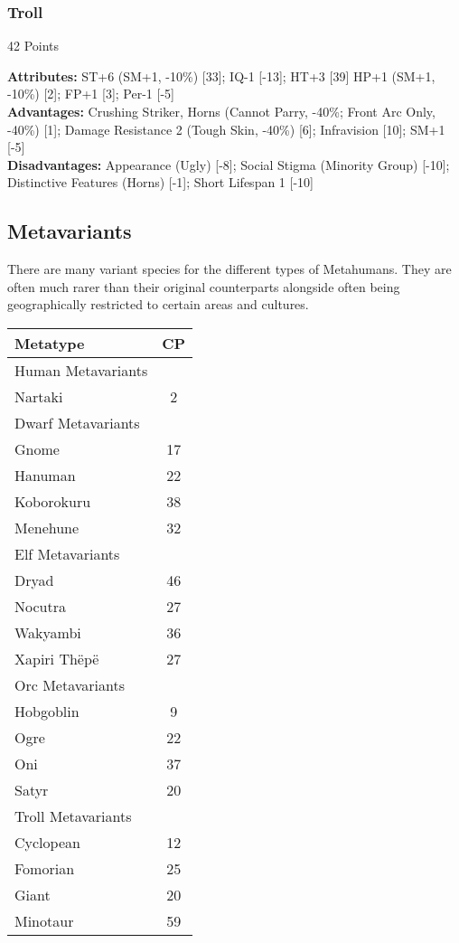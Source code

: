 \begin{multicols*}{3}
	\subsubsection*{Troll}
	\begin{flushright}
		42 Points
	\end{flushright}
	\textbf{Attributes:}
	ST+6 (SM+1, -10\%) [33]; IQ-1 [-13]; HT+3 [39] HP+1 (SM+1, -10\%) [2]; FP+1 [3]; Per-1 [-5]
	\\\textbf{Advantages:} 
	Crushing Striker, Horns (Cannot Parry, -40\%; Front Arc Only, -40\%) [1]; Damage Resistance 2 (Tough Skin, -40\%) [6]; Infravision [10]; SM+1 [-5]
	\\\textbf{Disadvantages:} 
	Appearance (Ugly) [-8]; Social Stigma (Minority Group) [-10]; Distinctive Features (Horns) [-1]; Short Lifespan 1 [-10]
	
	
	\subsection{Metavariants}
	
	There are many variant species for the different types of Metahumans. They are often much rarer than their original counterparts alongside often being geographically restricted to certain areas and cultures.
	
	\begin{center}
		\begin{tabularx}{0.32\textwidth}{|X|c|}
			\hline
			Metatype & CP \\
			\hline
			\hline
			Human Metavariants & \\
			\hline
			Nartaki & 2 \\
			\hline
			\hline
			Dwarf Metavariants & \\
			\hline
			Gnome & 17 \\
			Hanuman & 22 \\
			Koborokuru & 38 \\
			Menehune & 32 \\
			\hline
			\hline
			Elf Metavariants & \\
			\hline
			Dryad & 46 \\
			Nocutra & 27 \\
			Wakyambi & 36 \\
			Xapiri Thëpë & 27 \\
			\hline
			\hline
			Orc Metavariants & \\
			\hline
			Hobgoblin & 9 \\
			Ogre & 22 \\
			Oni & 37 \\
			Satyr & 20 \\
			\hline
			\hline
			Troll Metavariants & \\
			\hline
			Cyclopean & 12 \\
			Fomorian & 25 \\
			Giant & 20 \\
			Minotaur & 59 \\
			\hline
		\end{tabularx}
	\end{center}
	

\end{multicols*}
